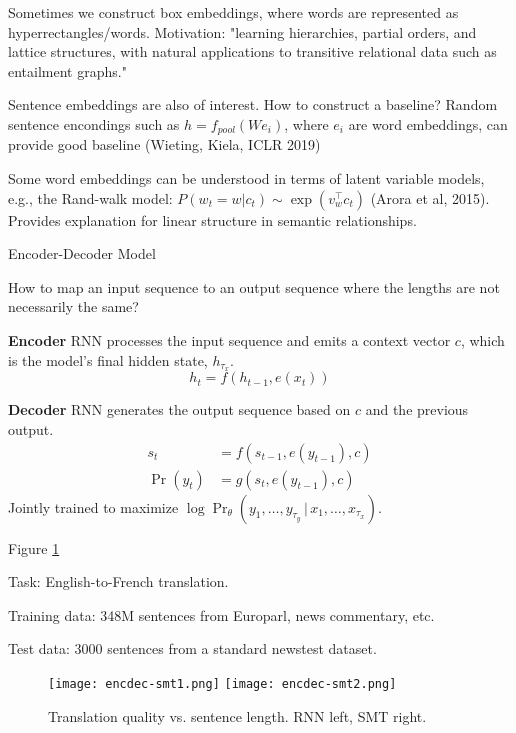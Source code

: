 \documentclass[english]{article}
\begin{document}
Sometimes we construct box embeddings, where words are represented as hyperrectangles/words. Motivation: "learning hierarchies, partial orders, and lattice structures, with natural applications to transitive relational data such as entailment graphs." 

Sentence embeddings are also of interest. How to construct a baseline? Random sentence encondings such as $h=f_{pool}(We_i)$, where $e_i$ are word embeddings, can provide good baseline (Wieting, Kiela, ICLR 2019)


Some word embeddings can be understood in terms of latent variable models, e.g., the Rand-walk model: $P(w_t=w|c_t)\sim \exp(v_w^\top c_t)$ (Arora et al, 2015). Provides explanation for linear structure in semantic relationships. 



\item 
 {Encoder-Decoder Model}

How to map an input sequence to an output sequence where the lengths are not necessarily the same?
 
\textbf{Encoder} RNN processes the input sequence and emits a context vector $c$, which is the model's final hidden state, $h_{\tau_x}$.
$$h_t = f(h_{t-1},e(x_t))$$

\textbf{Decoder} RNN generates the output sequence based on $c$ and the previous output.
\begin{align*}
s_t &= f(s_{t-1}, e(y_{t-1}), c)\\
\Pr(y_t) &= g(s_t, e(y_{t-1}), c)
\end{align*}
Jointly trained to maximize $\log{\Pr_\theta(y_1,\dots,y_{\tau_y}\,|\,x_1,\dots,x_{\tau_x})}$.
 

\item  Figure \ref{Encoder-Decoder Model}

Task: English-to-French translation.

Training data: 348M sentences from Europarl, news commentary, etc.

Test data: 3000 sentences from a standard newstest dataset.
\begin{figure}
\centering
\texttt{[image: encdec-smt1.png]}
\texttt{[image: encdec-smt2.png]}
\caption{Translation quality vs. sentence length. RNN left, SMT right.}
\label{Encoder-Decoder Model}
\end{figure}
\end{document}
